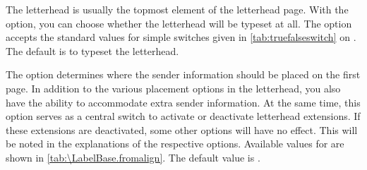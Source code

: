 \begin{Declaration}
\end{Declaration}
%
%
The letterhead is usually the topmost
element of the letterhead page. With the  option, you can
choose whether the letterhead will be typeset at all. The option accepts the
standard values for simple switches given in \autoref{tab:truefalseswitch} on
. The default is to typeset the letterhead.%
%
\EndIndexGroup


\begin{Declaration}
\end{Declaration}
%
%
The  option determines where
the sender information should be placed on the first page. In addition to the
various placement options in the letterhead, you also have the
ability to accommodate extra sender
information. At the same
time, this option serves as a central switch to activate
or deactivate letterhead extensions. If these extensions are deactivated, some
other options will have no effect. This will be noted in the explanations of
the respective options. Available values for  are shown in
\autoref{tab:\LabelBase.fromalign}. The default value is .%
%

